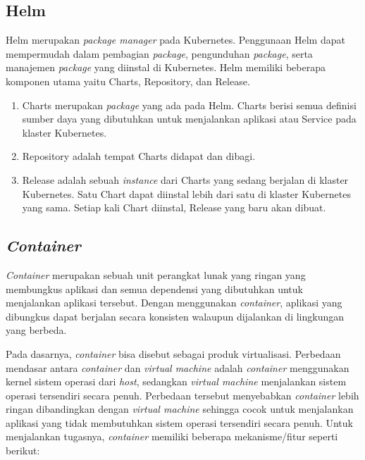 \subsection{Helm}
\label{chap:helm}

Helm merupakan \emph{package manager} pada Kubernetes. Penggunaan Helm dapat mempermudah
dalam pembagian \emph{package}, pengunduhan \emph{package}, serta manajemen \emph{package}
yang diinstal di Kubernetes. Helm memiliki beberapa komponen utama yaitu Charts, Repository, dan
Release.

\begin{enumerate}
  
  \item Charts merupakan \emph{package} yang ada pada Helm. Charts berisi semua definisi
    sumber daya yang dibutuhkan untuk menjalankan aplikasi atau Service pada klaster Kubernetes.

  \item Repository adalah tempat Charts didapat dan dibagi.

  \item Release adalah sebuah \emph{instance} dari Charts yang sedang berjalan di klaster
    Kubernetes. Satu Chart dapat diinstal lebih dari satu di klaster Kubernetes yang sama.
    Setiap kali Chart diinstal, Release yang baru akan dibuat.
  
\end{enumerate}

\subsection{\emph{Container}}
\label{sec:container}

\emph{Container} merupakan sebuah unit perangkat lunak yang ringan yang membungkus
aplikasi dan semua dependensi yang dibutuhkan untuk menjalankan aplikasi tersebut. Dengan menggunakan
\emph{container}, aplikasi yang dibungkus dapat berjalan secara konsisten walaupun dijalankan
di lingkungan yang berbeda.

Pada dasarnya, \emph{container} bisa disebut sebagai produk virtualisasi. Perbedaan
mendasar antara \emph{container} dan \emph{virtual machine} adalah \emph{container}
menggunakan kernel sistem operasi dari \emph{host}, sedangkan \emph{virtual machine} menjalankan
sistem operasi tersendiri secara penuh. Perbedaan tersebut menyebabkan \emph{container} lebih ringan
dibandingkan dengan \emph{virtual machine} sehingga cocok untuk menjalankan aplikasi
yang tidak membutuhkan sistem operasi tersendiri secara penuh.
Untuk menjalankan tugasnya, \emph{container} memiliki beberapa mekanisme/fitur seperti
berikut:


